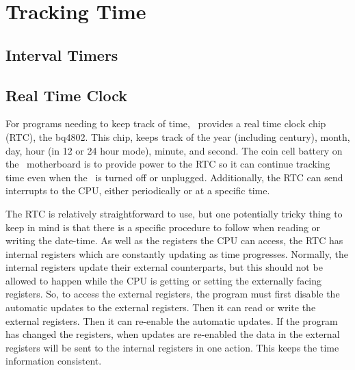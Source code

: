 \chapter{Tracking Time}

\section{Interval Timers}

\section{Real Time Clock}

For programs needing to keep track of time, \jr\ provides a real time clock chip (RTC), the bq4802. This chip, keeps track of the year (including century), month, day, hour (in 12 or 24 hour mode), minute, and second. The coin cell battery on the \jr\ motherboard is to provide power to the RTC so it can continue tracking time even when the \jr\ is turned off or unplugged. Additionally, the RTC can send interrupts to the CPU, either periodically or at a specific time.

The RTC is relatively straightforward to use, but one potentially tricky thing to keep in mind is that there is a specific procedure to follow when reading or writing the date-time. As well as the registers the CPU can access, the RTC has internal registers which are constantly updating as time progresses. Normally, the internal registers update their external counterparts, but this should not be allowed to happen while the CPU is getting or setting the externally facing registers. So, to access the external registers, the program must first disable the automatic updates to the external registers. Then it can read or write the external registers. Then it can re-enable the automatic updates. If the program has changed the registers, when updates are re-enabled the data in the external registers will be sent to the internal registers in one action. This keeps the time information consistent.

